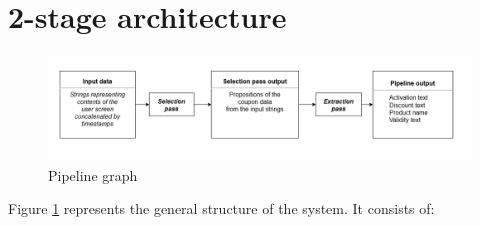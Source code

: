 \documentclass[licencjacka,en]{pracamgr}
\begin{document}
\section{2-stage architecture}
\begin{figure}
    \centering
    \includegraphics[width=1.0\linewidth]{bachelor_images/zpp.png}
    \caption{Pipeline graph}
    \label{fig:zpp}
\end{figure}
Figure \ref{fig:zpp} represents the general structure of the system. It consists of:
\end{document}
